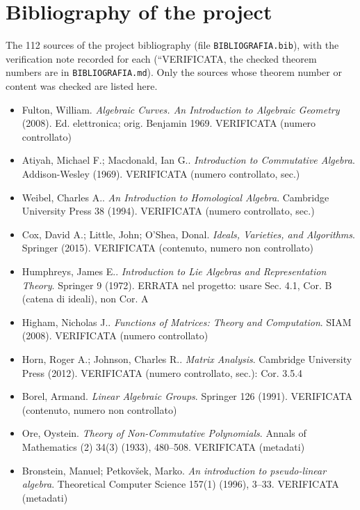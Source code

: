\chapter{Bibliography of the project}\label{app:biblio}
The 112 sources of the project bibliography (file \texttt{BIBLIOGRAFIA.bib}), with the verification note recorded for each (``VERIFICATA, the checked theorem numbers are in \texttt{BIBLIOGRAFIA.md}). Only the sources whose theorem number or content was checked are listed here.
\begin{itemize}[itemsep=2pt,leftmargin=1.2em,font=\small]
\item Fulton, William. \emph{Algebraic Curves. An Introduction to Algebraic Geometry} (2008). \textsf{\footnotesize Ed. elettronica; orig. Benjamin 1969. VERIFICATA (numero controllato)}
\item Atiyah, Michael F.; Macdonald, Ian G.. \emph{Introduction to Commutative Algebra}. Addison-Wesley (1969). \textsf{\footnotesize VERIFICATA (numero controllato, sec.)}
\item Weibel, Charles A.. \emph{An Introduction to Homological Algebra}. Cambridge University Press 38 (1994). \textsf{\footnotesize VERIFICATA (numero controllato, sec.)}
\item Cox, David A.; Little, John; O'Shea, Donal. \emph{Ideals, Varieties, and Algorithms}. Springer (2015). \textsf{\footnotesize VERIFICATA (contenuto, numero non controllato)}
\item Humphreys, James E.. \emph{Introduction to Lie Algebras and Representation Theory}. Springer 9 (1972). \textsf{\footnotesize ERRATA nel progetto: usare Sec. 4.1, Cor. B (catena di ideali), non Cor. A}
\item Higham, Nicholas J.. \emph{Functions of Matrices: Theory and Computation}. SIAM (2008). \textsf{\footnotesize VERIFICATA (numero controllato)}
\item Horn, Roger A.; Johnson, Charles R.. \emph{Matrix Analysis}. Cambridge University Press (2012). \textsf{\footnotesize VERIFICATA (numero controllato, sec.): Cor. 3.5.4}
\item Borel, Armand. \emph{Linear Algebraic Groups}. Springer 126 (1991). \textsf{\footnotesize VERIFICATA (contenuto, numero non controllato)}
\item Ore, Oystein. \emph{Theory of Non-Commutative Polynomials}. Annals of Mathematics (2) 34(3) (1933), 480--508. \textsf{\footnotesize VERIFICATA (metadati)}
\item Bronstein, Manuel; Petkov{\v s}ek, Marko. \emph{An introduction to pseudo-linear algebra}. Theoretical Computer Science 157(1) (1996), 3--33. \textsf{\footnotesize VERIFICATA (metadati)}

\end{itemize}
